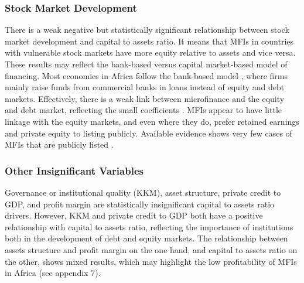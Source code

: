 \documentclass[a4paper, nobind]{templates/ociamthesis}
\begin{document}
\hypertarget{stock-market-development}{%
\subsubsection{Stock Market Development}\label{stock-market-development}}

There is a weak negative but statistically significant relationship between stock market development and capital to assets ratio. It means that MFIs in countries with vulnerable stock markets have more equity relative to assets and vice versa. These results may reflect the bank-based versus capital market-based model of financing. Most economies in Africa follow the bank-based model \autocite{gropp2010determinants}, where firms mainly raise funds from commercial banks in loans instead of equity and debt markets. Effectively, there is a weak link between microfinance and the equity and debt market, reflecting the small coefficients \autocite{ahmed2014financial}. MFIs appear to have little linkage with the equity markets, and even where they do, prefer retained earnings and private equity to listing publicly. Available evidence shows very few cases of MFIs that are publicly listed \autocite{hishigsuren2006transformation}.

\hypertarget{other-insignificant-variables}{%
\subsubsection{Other Insignificant Variables}\label{other-insignificant-variables}}

Governance or institutional quality (KKM), asset structure, private credit to GDP, and profit margin are statistically insignificant capital to assets ratio drivers. However, KKM and private credit to GDP both have a positive relationship with capital to assets ratio, reflecting the importance of institutions both in the development of debt and equity markets. The relationship between assets structure and profit margin on the one hand, and capital to assets ratio on the other, shows mixed results, which may highlight the low profitability of MFIs in Africa (see appendix 7).
\end{document}
